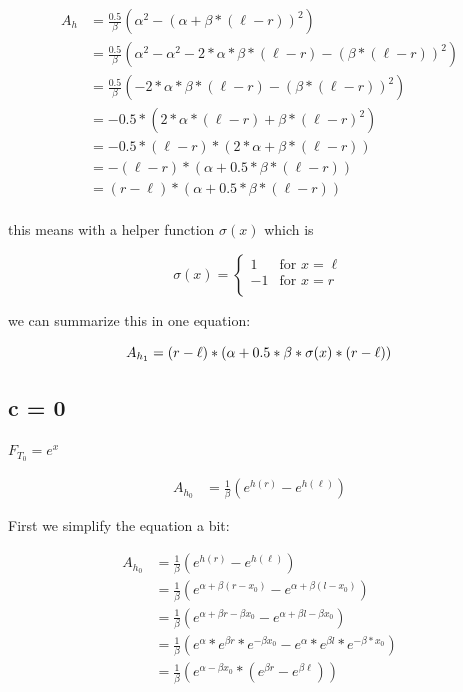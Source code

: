 \documentclass[]{article}
\begin{document}
\begin{align*}
A_h &= \frac{0.5}{\beta} \left( \alpha^2 - (\alpha + \beta * (\ell - r))^2 \right) \\
&= \frac{0.5}{\beta} \left( \alpha^2 - \alpha^2 - 2 * \alpha * \beta * (\ell - r) - (\beta * (\ell - r))^2   \right) \\
&= \frac{0.5}{\beta} \left( - 2 * \alpha * \beta * (\ell - r) - (\beta * (\ell - r))^2 \right) \\
&= -0.5 * \left( 2 * \alpha * (\ell - r) + \beta * (\ell - r)^2 \right) \\
&= -0.5 * (\ell - r) * \left( 2 * \alpha  + \beta * (\ell - r) \right) \\
&= - (\ell - r) * \left( \alpha  + 0.5 * \beta * (\ell - r) \right) \\
&= (r - \ell) * \left( \alpha  + 0.5 * \beta * (\ell - r) \right) \\
\end{align*}

this means with a helper function $\sigma(x)$ which is

\[
	\sigma(x) =
	\begin{cases}
		1 & \text{for } x = \ell \\
		-1 & \text{for } x = r \\
	\end{cases}
\]

we can summarize this in one equation:

\[
	A_{h_1} = (r - \ell) * \left( \alpha  + 0.5 * \beta * \sigma(x) * (r - \ell) \right) \\
\]

\subsection{c = 0}

$F_{T_0} = e^x$

\begin{align*}
A_{h_0} &= \frac{1}{\beta} \left( e^{h(r)} - e^{h(\ell)} \right)
\end{align*}

First we simplify the equation a bit:

\begin{align*}
A_{h_0} &= \frac{1}{\beta} \left( e^{h(r)} - e^{h(\ell)} \right) \\
	&= \frac{1}{\beta} \left( e^{\alpha + \beta (r - x_0)} - e^{\alpha + \beta (l - x_0)} \right) \\
	&= \frac{1}{\beta} \left( e^{\alpha + \beta r - \beta x_0} - e^{\alpha + \beta l - \beta x_0} \right) \\
	&= \frac{1}{\beta} \left( e^{\alpha} * e^{\beta r} * e^{-\beta x_0} - e^{\alpha} * e^{\beta l} * e^{- \beta * x_0} \right) \\
	&= \frac{1}{\beta} \left( e^{\alpha - \beta x_0} * \left(e^{\beta r} - e^{\beta \ell} \right) \right) \\
\end{align*}
\end{document}
